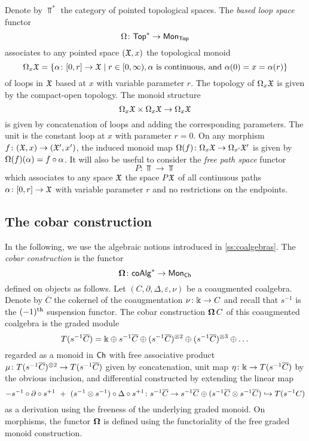 Denote by $\Top^\ast$ the category of pointed topological spaces. The \textit{based loop space} functor
\[ \Omega \colon \mathsf{Top}^\ast \to \mathsf{Mon}_{\mathsf{Top}}\]
associates to any pointed space $(\mathfrak{X},x)$ the topological monoid
\[\Omega_x \mathfrak{X}= \{ \alpha \colon [0,r] \to \mathfrak{X} \mid r \in [0, \infty), \text{$\alpha$ is continuous, and } \alpha(0)=x=\alpha(r)\}
\]
of loops in $\mathfrak{X}$ based at $x$ with variable parameter $r$. The topology of $\Omega_x \mathfrak{X}$ is given by the compact-open topology. The monoid structure \[\Omega_x \mathfrak{X}  \times \Omega_x \mathfrak{X} \to \Omega_x \mathfrak{X}\] is given by concatenation of loops and adding the corresponding parameters. The unit is the constant loop at $x$ with parameter $r=0$. On any morphism $f \colon (\mathfrak{X},x) \to (\mathfrak{X}',x')$, the induced monoid map $\Omega (f) \colon \Omega_x \mathfrak{X} \to \Omega_{x'} \mathfrak{X}'$ is given by $\Omega(f) (\alpha) = f\circ\alpha$. It will also be useful to consider the \textit{free path space} functor
\[
P \colon \Top \to \Top
\]
which associates to any space $\mathfrak{X}$ the space $P\mathfrak{X}$ of all continuous paths $\alpha \colon [0,r] \to \mathfrak{X}$ with variable parameter $r$ and no restrictions on the endpoints. 
\subsection{The cobar construction}\label{ss:cobar construction}
In the following, we use the algebraic notions introduced in \cref{ss:coalgebras}. The \textit{cobar construction} is the functor
\[
\operatorname{\mathbf{\Omega}} \colon \mathsf{coAlg}^\ast \to \mathsf{Mon}_{\mathsf{Ch}}
\]
defined on objects as follows.
Let $(C, \partial, \Delta, \varepsilon, \nu)$ be a coaugmented coalgebra.
Denote by $\overline{C}$ the cokernel of the coaugmentation $\nu \colon \Bbbk \to C$ and recall that $s^{-1}$ is the $(-1)^{\mathrm{th}}$ suspension functor.
The cobar construction $\operatorname{\mathbf{\Omega}} C$ of this coaugmented coalgebra is the graded module
\[
T(s^{-1} \overline{C}) = \Bbbk \oplus s^{-1}\overline{C} \oplus (s^{-1}\overline{C})^{\otimes 2} \oplus (s^{-1}\overline{C})^{\otimes 3} \oplus \dots
\]
regarded as a monoid in $\mathsf{Ch}$ with free associative product $\mu \colon T(s^{-1} \overline{C})^{\otimes 2} \to T(s^{-1} \overline{C})$ given by concatenation, unit map $\eta \colon \Bbbk \to T(s^{-1} \overline{C})$ by the obvious inclusion, and differential constructed by extending the linear map
\[
- s^{-1} \circ \partial \circ s^{+1} \ + \ (s^{-1} \otimes s^{-1}) \circ \Delta \circ s^{+1} \colon
s^{-1} \overline{C} \to s^{-1}\overline{C} \oplus (s^{-1}\overline{C} \otimes s^{-1}\overline{C}) \hookrightarrow T(s^{-1}C)
\]
as a derivation using the freeness of the underlying graded monoid.  On morphisms, the functor $\operatorname{\mathbf{\Omega}}$ is defined using the functoriality of the free graded monoid construction. 


